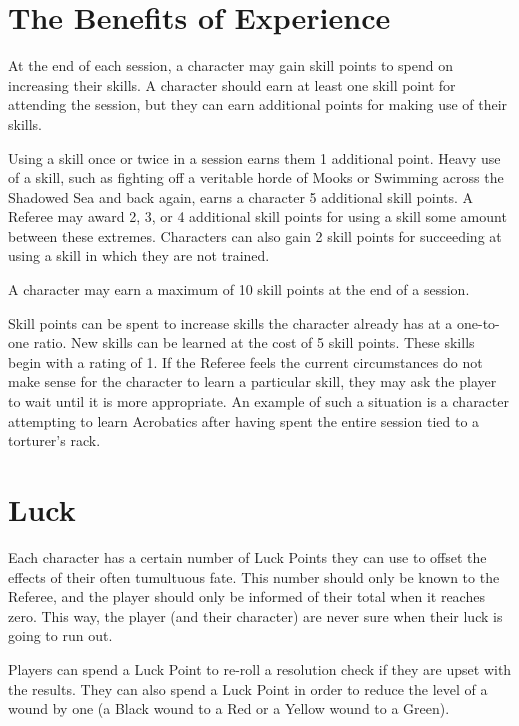 \documentclass[oneside]{book}
\begin{document}
\begin{multicols}{2}

\section{The Benefits of Experience}

At the end of each session, a character may gain skill points to spend on increasing their skills. A character should earn at least one skill point for attending the session, but they can earn additional points for making use of their skills. 

Using a skill once or twice in a session earns them 1 additional point. Heavy use of a skill, such as fighting off a veritable horde of Mooks or Swimming across the Shadowed Sea and back again, earns a character 5 additional skill points. A Referee may award 2, 3, or 4 additional skill points for using a skill some amount between these extremes. Characters can also gain 2 skill points for succeeding at using a skill in which they are not trained.

A character may earn a maximum of 10 skill points at the end of a session. 

Skill points can be spent to increase skills the character already has at a one-to-one ratio. New skills can be learned at the cost of 5 skill points. These skills begin with a rating of 1. If the Referee feels the current circumstances do not make sense for the character to learn a particular skill, they may ask the player to wait until it is more appropriate. An example of such a situation is a character attempting to learn Acrobatics after having spent the entire session tied to a torturer's rack. 

\section{Luck}
Each character has a certain number of Luck Points they can use to offset the effects of their often tumultuous fate. This number should only be known to the Referee, and the player should only be informed of their total when it reaches zero. This way, the player (and their character) are never sure when their luck is going to run out. 

Players can spend a Luck Point to re-roll a resolution check if they are upset with the results. They can also spend a Luck Point in order to reduce the level of a wound by one (a Black wound to a Red or a Yellow wound to a Green).


\end{multicols}
\end{document}
